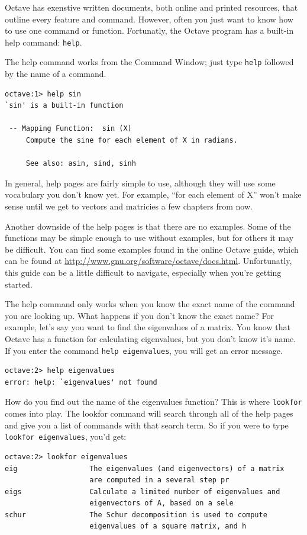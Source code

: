 \documentclass{book}
\begin{document}
Octave has exenstive written documents, both online and printed resources,
that outline every feature and command. However, often you just want to know
how to use one command or function. Fortunatly, the Octave program has a
built-in help command:
{\tt help}.

The help command works from the Command Window; just type {\tt help}
followed by the name of a command.

\begin{verbatim}
octave:1> help sin
`sin' is a built-in function

 -- Mapping Function:  sin (X)
     Compute the sine for each element of X in radians.

     See also: asin, sind, sinh
\end{verbatim}

In general, help pages are fairly simple to use, although they will use some
vocabulary you don't know yet. For example, ``for each element of X'' won't make
sense until we get to vectors and matricies a few chapters from now.

Another downside of the help pages is that there are no examples. Some of the
functions may be simple enough to use without examples, but for others it
may be difficult. You can find some examples found in the online Octave guide,
which can be found at \url{http://www.gnu.org/software/octave/docs.html}.
Unfortunatly, this guide can be a little difficult to navigate, especially when
you're getting started.

The help command only works when you know the exact name of the command you are
looking up. What happens if you don't know the exact name? For example, let's
say you want to find the eigenvalues of a matrix. You know that Octave has a
function for calculating eigenvalues, but you don't know it's name. If you enter
the command {\tt help eigenvalues}, you will get an error message.

\begin{verbatim}
octave:2> help eigenvalues
error: help: `eigenvalues' not found
\end{verbatim}

How do you find out the name of the eigenvalues function? This is where
{\tt lookfor} comes into play. The lookfor command will search through
all of the help pages and give you a list of commands with that search term. So
if you were to type {\tt lookfor eigenvalues}, you'd get:

\begin{verbatim}
octave:2> lookfor eigenvalues
eig                 The eigenvalues (and eigenvectors) of a matrix 
                    are computed in a several step pr
eigs                Calculate a limited number of eigenvalues and
                    eigenvectors of A, based on a sele
schur               The Schur decomposition is used to compute 
                    eigenvalues of a square matrix, and h
\end{verbatim}
\end{document}
